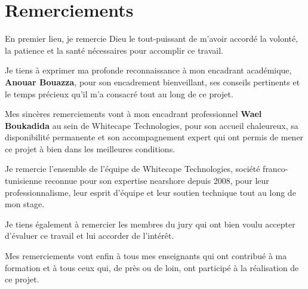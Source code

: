 \chapter*{Remerciements}
\thispagestyle{empty}

En premier lieu, je remercie Dieu le tout-puissant de m'avoir accordé la volonté,
la patience et la santé nécessaires pour accomplir ce travail.
\vspace{0.5cm}


Je tiens à exprimer ma profonde reconnaissance à mon encadrant académique,
\textbf{Anouar Bouazza}, pour son encadrement bienveillant, ses conseils pertinents
et le temps précieux qu'il m'a consacré tout au long de ce projet.
\vspace{0.5cm}


Mes sincères remerciements vont à mon encadrant professionnel \textbf{Wael Boukadida}
au sein de Whitecape Technologies, pour son accueil chaleureux, sa disponibilité permanente et son accompagnement expert qui ont permis de mener ce projet à bien dans les meilleures conditions.
\vspace{0.5cm}


Je remercie l'ensemble de l'équipe de Whitecape Technologies, société franco-tunisienne
reconnue pour son expertise nearshore depuis 2008, pour leur professionnalisme, leur
esprit d'équipe et leur soutien technique tout au long de mon stage.
\vspace{0.5cm}

Je tiens également à remercier les membres du jury qui ont bien voulu accepter
d'évaluer ce travail et lui accorder de l'intérêt.
\vspace{0.5cm}

Mes remerciements vont enfin à tous mes enseignants qui ont contribué à ma
formation et à tous ceux qui, de près ou de loin, ont participé à la réalisation de
ce projet.
